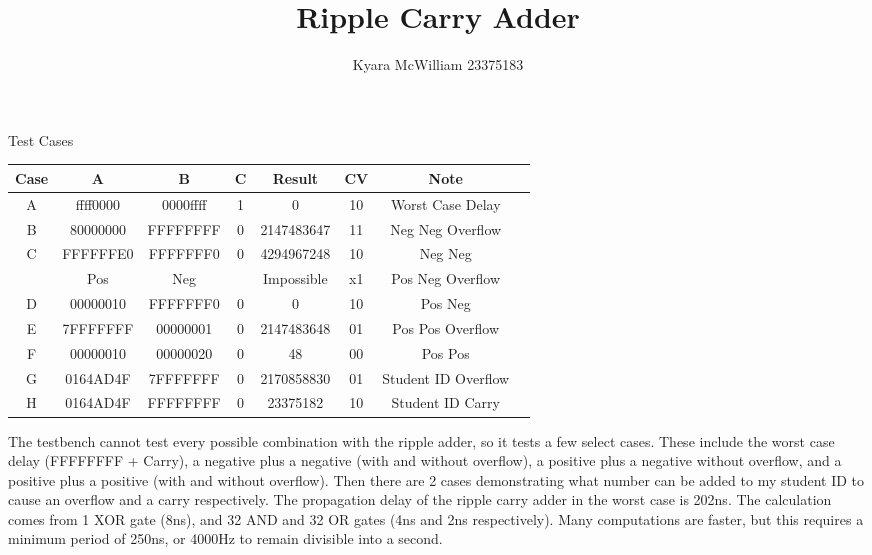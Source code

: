 \documentclass{article}
\title{Ripple Carry Adder}
\author{Kyara McWilliam 23375183}
\date{}
\begin{document}
\maketitle

Test Cases
\hfill \break

\begin{tabular}{ |c|c|c|c|c|c|c|c| }
\hline
Case & A & B & C & Result & CV & Note \\
\hline
A & ffff0000 & 0000ffff & 1 & 0 & 10 & Worst Case Delay \\
B & 80000000 & FFFFFFFF & 0 & 2147483647 & 11 & Neg Neg Overflow \\
C & FFFFFFE0 & FFFFFFF0 & 0 & 4294967248 & 10 & Neg Neg \\
& Pos & Neg & & Impossible & x1 & Pos Neg Overflow\\
D & 00000010 & FFFFFFF0 & 0 & 0 & 10 & Pos Neg \\
E & 7FFFFFFF & 00000001 & 0 & 2147483648 & 01 & Pos Pos Overflow \\
F & 00000010 & 00000020 & 0 & 48 & 00 & Pos Pos \\
G & 0164AD4F & 7FFFFFFF & 0 & 2170858830 & 01 & Student ID Overflow \\
H & 0164AD4F & FFFFFFFF & 0 & 23375182 & 10 & Student ID Carry \\
\hline
\end{tabular}
\hfill \break \break
The testbench cannot test every possible combination with the ripple adder, so it tests a few select cases. These include the worst case delay (FFFFFFFF + Carry), a negative plus a negative (with and without overflow), a positive plus a negative without overflow, and a positive plus a positive (with and without overflow). Then there are 2 cases demonstrating what number can be added to my student ID to cause an overflow and a carry respectively.
\hfill \break \break
The propagation delay of the ripple carry adder in the worst case is 202ns. The calculation comes from 1 XOR gate (8ns), and 32 AND and 32 OR gates (4ns and 2ns respectively). Many computations are faster, but this requires a minimum period of 250ns, or 4000Hz to remain divisible into a second.
\end{document}
